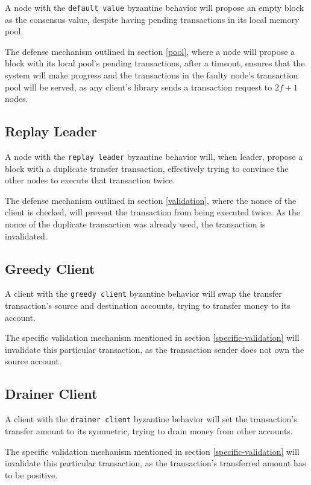 \documentclass[letterpaper,twocolumn,10pt]{article}
\begin{document}
A node with the \texttt{default value} byzantine behavior will propose an empty block as the consensus value, despite having pending transactions in its local memory pool.

The defense mechanism outlined in section \ref{pool}, where a node will propose a block with its local pool's pending transactions, after a timeout, ensures that the system will make progress and the transactions in the faulty node's transaction pool will be served, as any client's library sends a transaction request to $2f + 1$ nodes.

\subsection{Replay Leader}

A node with the \texttt{replay leader} byzantine behavior will, when leader, propose a block with a duplicate transfer transaction, effectively trying to convince the other nodes to execute that transaction twice.

The defense mechanism outlined in section \ref{validation}, where the nonce of the client is checked, will prevent the transaction from being executed twice. As the nonce of the duplicate transaction was already used, the transaction is invalidated.

\subsection{Greedy Client}

A client with the \texttt{greedy client} byzantine behavior will swap the transfer transaction's source and destination accounts, trying to transfer money to its account.

The specific validation mechanism mentioned in section \ref{specific-validation} will invalidate this particular transaction, as the transaction sender does not own the source account.

\subsection{Drainer Client}

A client with the \texttt{drainer client} byzantine behavior will set the transaction's transfer amount to its symmetric, trying to drain money from other accounts.

The specific validation mechanism mentioned in section \ref{specific-validation} will invalidate this particular transaction, as the transaction's transferred amount has to be positive.




\end{document}
